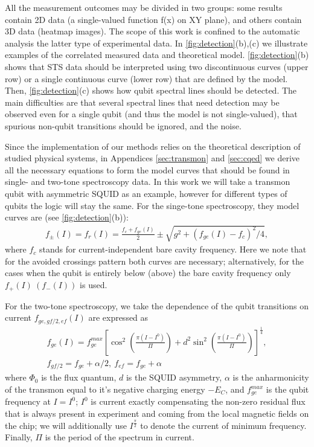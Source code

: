 \documentclass[%
 aip,
 amsmath,amssymb,
 reprint,%
]{revtex4-1}
\begin{document}
All the measurement outcomes may be divided in two groups: some results contain 2D data (a single-valued function f(x) on XY plane), and others contain 3D data (heatmap images). The scope of this work is confined to the automatic analysis the latter type of experimental data. In \autoref{fig:detection}(b),(c) we illustrate examples of the correlated measured data and theoretical model. \autoref{fig:detection}(b) shows that STS data should be interpreted using two discontinuous curves (upper row) or a single continuous curve (lower row) that are defined by the model. Then, \autoref{fig:detection}(c) shows how qubit spectral lines should be detected. The main difficulties are that several spectral lines that need detection may be observed even for a single qubit (and thus the model is not single-valued), that spurious non-qubit transitions should be ignored, and the noise.

Since the implementation of our methods relies on the theoretical description of studied physical systems, in Appendices \ref{sec:transmon} and \ref{sec:cqed} we derive all the necessary equations to form the model curves that should be found in single- and two-tone spectroscopy data. In this work we will take a transmon qubit with asymmetric SQUID as an example, however for different types of qubits the logic will stay the same. For the singe-tone spectroscopy, they model curves are (see \autoref{fig:detection}(b)):
\begin{align}
f_\pm(I) = f_r(I) = \frac{f_c + f_{ge}(I)}{2} \pm \sqrt{g^2+(f_{ge}(I) - f_c)^2/4},\label{eq:f_r}
\end{align}
where $f_c$ stands for current-independent bare cavity frequency. Here we note that for the avoided crossings pattern both curves are necessary; alternatively, for the cases when the qubit is entirely below (above) the bare cavity frequency only $ f_+(I)\ \left(f_-(I)\right)$ is used. 

For the two-tone spectroscopy, we take the dependence of the qubit transitions on current $f_{ge, gf/2, ef}(I)$ are expressed as
\begin{equation}
\begin{gathered}
f_{ge}(I) = f_{ge}^{max} \left[\cos^2\left(\frac{\pi(I-I^0)}{\Pi}\right)+d^2 \sin^2 \left(\frac{\pi(I-I^0)}{\Pi}\right)\right]^\frac{1}{4}, \\
f_{gf/2} = f_{ge} + \alpha/2,\ f_{ef}=f_{ge} + \alpha
\end{gathered}
\end{equation}
where $\Phi_0$ is the flux quantum, $d$ is the SQUID asymmetry, $\alpha$ is the anharmonicity of the transmon equal to it's negative charging energy $-E_C$, and $f_{ge}^{max}$ is the qubit frequency at $I = I^0$; $I^0$ is current exactly compensating the non-zero residual flux that is always present in experiment and coming from the local magnetic fields on the chip; we will additionally use $I^{\frac{\pi}{2}}$ to denote the current of minimum frequency. Finally, $\Pi$ is the period of the spectrum in current.
\end{document}
